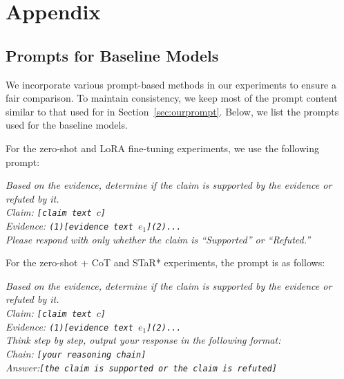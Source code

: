 


\section{Appendix}

\subsection{Prompts for Baseline Models}
\label{sec:appendix_prompt_baseline}
We incorporate various prompt-based methods in our experiments to ensure a fair comparison. To maintain consistency, we keep most of the prompt content similar to that used for \themodel in Section~\ref{sec:ourprompt}. Below, we list the prompts used for the baseline models.

For the zero-shot and LoRA fine-tuning experiments, we use the following prompt:
\begin{mybox}
\textit{Based on the evidence, determine if the claim is supported by the evidence or refuted by it.\\
Claim: \texttt{[claim text $c$]}\\
Evidence: \texttt{(1)[evidence text $e_1$](2)...}}\\
\textit{Please respond with only whether the claim is ``Supported'' or ``Refuted.''}
\end{mybox}

For the zero-shot + CoT and STaR* experiments, the prompt is as follows:
\begin{mybox}
\textit{Based on the evidence, determine if the claim is supported by the evidence or refuted by it.\\
Claim: \texttt{[claim text $c$]}\\
Evidence: \texttt{(1)[evidence text $e_1$](2)...}}\\
\textit{Think step by step, output your response in the following format:\\
Chain: \texttt{[your reasoning chain]}\\
Answer:\texttt{[the claim is supported or the claim is refuted]}}
\end{mybox}

